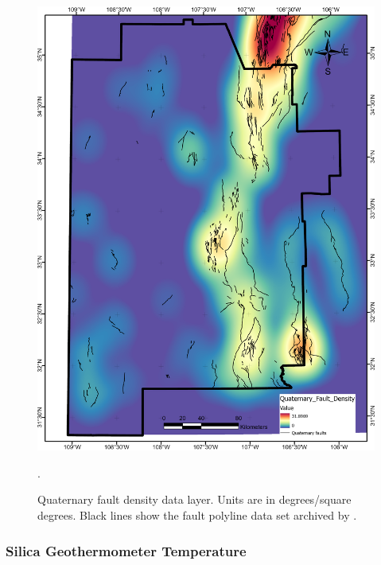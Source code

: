 \begin{figure}[!htp]
\centering
\includegraphics[scale=.50]{templates/images/Figure-QFaultDensity.png}
\caption[Quaternary fault density data layer]{Quaternary fault density data layer. Units are in degrees/square degrees. Black lines show the fault polyline data set archived by \protect\citet{bielicki_hydrogeolgic_2015}.}.
\label{fig:feat_qfaults}
\end{figure}

\subsubsection{Silica Geothermometer Temperature}

